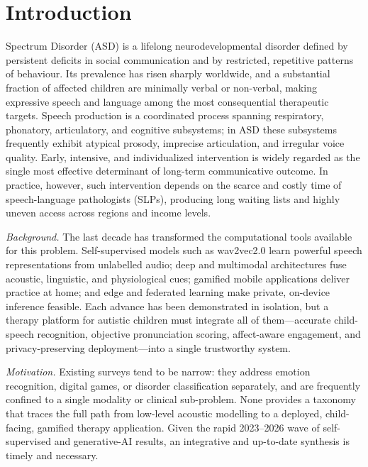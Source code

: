 \documentclass[conference]{IEEEtran}
\begin{document}
\section{Introduction}
 Spectrum Disorder (ASD) is a lifelong neurodevelopmental disorder defined by persistent deficits in social communication and by restricted, repetitive patterns of behaviour. Its prevalence has risen sharply worldwide, and a substantial fraction of affected children are minimally verbal or non-verbal, making expressive speech and language among the most consequential therapeutic targets. Speech production is a coordinated process spanning respiratory, phonatory, articulatory, and cognitive subsystems; in ASD these subsystems frequently exhibit atypical prosody, imprecise articulation, and irregular voice quality. Early, intensive, and individualized intervention is widely regarded as the single most effective determinant of long-term communicative outcome. In practice, however, such intervention depends on the scarce and costly time of speech-language pathologists (SLPs), producing long waiting lists and highly uneven access across regions and income levels.

\textit{Background.} The last decade has transformed the computational tools available for this problem. Self-supervised models such as wav2vec2.0 learn powerful speech representations from unlabelled audio; deep and multimodal architectures fuse acoustic, linguistic, and physiological cues; gamified mobile applications deliver practice at home; and edge and federated learning make private, on-device inference feasible. Each advance has been demonstrated in isolation, but a therapy platform for autistic children must integrate all of them---accurate child-speech recognition, objective pronunciation scoring, affect-aware engagement, and privacy-preserving deployment---into a single trustworthy system.

\textit{Motivation.} Existing surveys tend to be narrow: they address emotion recognition, digital games, or disorder classification separately, and are frequently confined to a single modality or clinical sub-problem. None provides a taxonomy that traces the full path from low-level acoustic modelling to a deployed, child-facing, gamified therapy application. Given the rapid 2023--2026 wave of self-supervised and generative-AI results, an integrative and up-to-date synthesis is timely and necessary.
\end{document}
